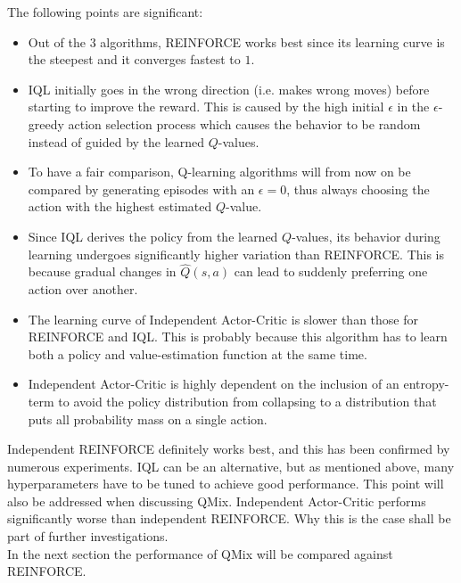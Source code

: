 The following points are significant:
\begin{itemize}
    \item Out of the 3 algorithms, REINFORCE works best since its learning curve is the steepest and it converges fastest to $1$.
    \item IQL initially goes in the wrong direction (i.e. makes wrong moves) before starting to improve the reward. This is caused by the high initial $\epsilon$ in the $\epsilon$-greedy action selection process which causes the behavior to be random instead of guided by the learned $Q$-values.
    \item To have a fair comparison, Q-learning algorithms will from now on be compared by generating episodes with an $\epsilon = 0$, thus always choosing the action with the highest estimated $Q$-value.
    \item Since IQL derives the policy from the learned $Q$-values, its behavior during learning undergoes significantly higher variation than REINFORCE. This is because gradual changes in $\hat Q(s, a)$ can lead to suddenly preferring one action over another.
    \item The learning curve of Independent Actor-Critic is slower than those for REINFORCE and IQL. This is probably because this algorithm has to learn both a policy and value-estimation function at the same time.
    \item Independent Actor-Critic is highly dependent on the inclusion of an entropy-term to avoid the policy distribution from collapsing to a distribution that puts all probability mass on a single action.
\end{itemize}

Independent REINFORCE definitely works best, and this has been confirmed by numerous experiments. IQL can be an alternative, but as mentioned above, many hyperparameters have to be tuned to achieve good performance. This point will also be addressed when discussing QMix. Independent Actor-Critic performs significantly worse than independent REINFORCE. Why this is the case shall be part of further investigations.\\
In the next section the performance of QMix will be compared against REINFORCE.

